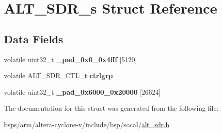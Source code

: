 \hypertarget{structALT__SDR__s}{}\section{A\+L\+T\+\_\+\+S\+D\+R\+\_\+s Struct Reference}
\label{structALT__SDR__s}
\subsection*{Data Fields}
\begin{DoxyCompactItemize}
\item 
\mbox{\label{structALT__SDR__s_ab5d0b6bd93a03810f9e5ef57ca1e37c9}} 
volatile uint32\+\_\+t {\bfseries \+\_\+pad\+\_\+0x0\+\_\+0x4fff} \mbox{[}5120\mbox{]}
\item 
\mbox{\label{structALT__SDR__s_a72df49600e30b4561269f77b2b2b8fd6}} 
volatile A\+L\+T\+\_\+\+S\+D\+R\+\_\+\+C\+T\+L\+\_\+t {\bfseries ctrlgrp}
\item 
\mbox{\label{structALT__SDR__s_adf8ffe51bb6b6620c0c85da5e714cb9a}} 
volatile uint32\+\_\+t {\bfseries \+\_\+pad\+\_\+0x6000\+\_\+0x20000} \mbox{[}26624\mbox{]}
\end{DoxyCompactItemize}


The documentation for this struct was generated from the following file\+:\begin{DoxyCompactItemize}
\item 
bsps/arm/altera-\/cyclone-\/v/include/bsp/socal/\mbox{\hyperlink{alt__sdr_8h}{alt\+\_\+sdr.\+h}}\end{DoxyCompactItemize}
